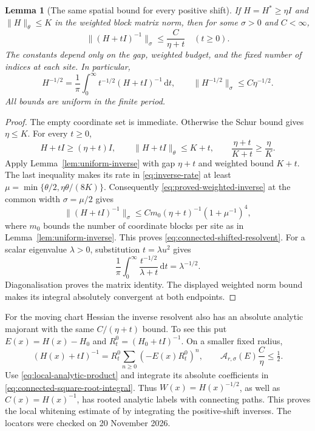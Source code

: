 \documentclass[11pt,reqno]{amsart}
\numberwithin{equation}{section}
\newtheorem{lemma}[theorem]{Lemma}
\theoremstyle{definition}
\theoremstyle{remark}
\newcommand{\dd}{\mathrm d}
\begin{document}
\begin{lemma}[The same spatial bound for every positive shift]
\label{lem:connected-shifted-resolvent}
If \(H=H^*\ge\eta I\) and \(\|H\|_\theta\le K\)
in the weighted block matrix norm, then for
some \(\sigma>0\) and \(C<\infty\),
\begin{equation}
                  \|(H+tI)^{-1}\|_\sigma
                             \le\frac{C}{\eta+t}
                                      \quad(t\ge0).
 \label{eq:connected-shifted-resolvent}
\end{equation}
The constants depend only on the gap, weighted
budget, and the fixed number of indices at
each site. In particular,
\begin{equation}
 H^{-1/2}=\frac1\pi\int_0^\infty
                 t^{-1/2}(H+tI)^{-1}\,\dd t,\qquad
                  \|H^{-1/2}\|_\sigma\le C\eta^{-1/2}.
 \label{eq:connected-square-root-integral}
\end{equation}
All bounds are uniform in the finite period.
\end{lemma}
\begin{proof}
The empty coordinate set is immediate.
Otherwise the Schur bound gives \(\eta\le K\).
For every \(t\ge0\),
\[
 H+tI\ge(\eta+t)I,\qquad
 \|H+tI\|_\theta\le K+t,\qquad
 \frac{\eta+t}{K+t}\ge\frac{\eta}{K}.
\]
Apply Lemma~\ref{lem:uniform-inverse} with gap
\(\eta+t\) and weighted bound \(K+t\).
The last inequality makes its rate in
\eqref{eq:inverse-rate} at least
\(\mu=\min\{\theta/2,\eta\theta/(8K)\}\).
Consequently \eqref{eq:proved-weighted-inverse}
at the common width \(\sigma=\mu/2\) gives
\[
 \|(H+tI)^{-1}\|_\sigma
 \le C m_0(\eta+t)^{-1}(1+\mu^{-1})^4,
\]
where \(m_0\) bounds the number of coordinate
blocks per site as in Lemma~\ref{lem:uniform-inverse}.
This proves \eqref{eq:connected-shifted-resolvent}.
For a scalar eigenvalue \(\lambda>0\),
substitution \(t=\lambda u^2\) gives
\[
     \frac1\pi\int_0^\infty
                \frac{t^{-1/2}}{\lambda+t}\,\dd t
                                          =\lambda^{-1/2}.
\]
Diagonalisation proves the matrix identity.
The displayed weighted norm bound makes its
integral absolutely convergent at both
endpoints.
\end{proof}

For the moving chart Hessian the inverse
resolvent also has an absolute analytic
majorant with the same \(C/(\eta+t)\)
bound. To see this put \(E(x)=H(x)-H_0\)
and \(R_t^0=(H_0+tI)^{-1}\).
On a smaller fixed radius,
\[
 (H(x)+tI)^{-1}
       =R_t^0\sum_{n\ge0}(-E(x)R_t^0)^n,\qquad
       \mathcal A_{r,\sigma}(E)
                                \frac C\eta\le\tfrac12 .
\]
Use \eqref{eq:local-analytic-product} and
integrate its absolute coefficients in
\eqref{eq:connected-square-root-integral}.
Thus \(W(x)=H(x)^{-1/2}\), as well as
\(C(x)=H(x)^{-1}\), has rooted
analytic labels with connecting paths.
This proves the local whitening estimate of
\cite[Lemma~23.1, pp.~115--116]{Main} by integrating
the positive-shift inverses. The locators were checked on
20 November 2026.
\end{document}
